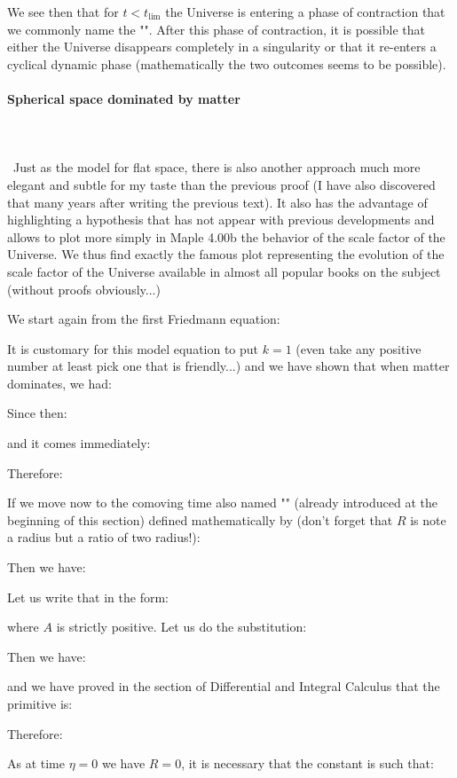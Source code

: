 	We see then that for $t<t_{\lim}$ the Universe is entering a phase of contraction that we commonly name the "". After this phase of contraction, it is possible that either the Universe disappears completely in a singularity or that it re-enters a cyclical dynamic phase (mathematically the two outcomes seems to be possible).
	
	\paragraph{Spherical space dominated by matter}\mbox{}\\\\\
	Just as the model for flat space, there is also another approach much more elegant and subtle for my taste than the previous proof (I have also discovered that many years after writing the previous text). It also has the advantage of highlighting a hypothesis that has not appear with previous developments and allows to plot more simply in Maple 4.00b the behavior of the scale factor of the Universe. We thus find exactly the famous plot representing the evolution of the scale factor of the Universe available in almost all popular books on the subject (without proofs obviously...)

	We start again from the first Friedmann equation:
	
	It is customary for this model equation to put $k=1$ (even take any positive number at least pick one that is friendly...) and we have shown that when matter dominates, we had:
	
	Since then:
	
	and it comes immediately:
	
	Therefore:
	
	If we move now to the comoving time also named "" (already introduced at the beginning of this section) defined mathematically by (don't forget that $R$ is note a radius but a ratio of two radius!):
	
	Then we have:
	
	Let us write that in the form:
	
	where $A$ is strictly positive. Let us do the substitution:
	
	Then we have:
	
	and we have proved in the section of Differential and Integral Calculus that the primitive is:
	
	Therefore:
	
	As at time $\eta=0$ we have $R=0$, it is necessary that the constant is such that:
	
